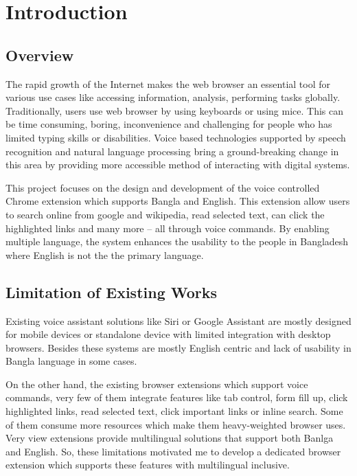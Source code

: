 


	\chapter{Introduction}
	\section{Overview}
	The rapid growth of the Internet makes the web browser an essential tool for various use cases like accessing information, analysis, performing tasks globally. Traditionally, users use web browser by using keyboards or using mice. This can be time consuming, boring, inconvenience and challenging for people who has limited typing skills or disabilities. Voice based technologies supported by speech recognition and natural language processing bring a ground-breaking change in this area by providing more accessible method of interacting with digital systems.
	
	
	This project focuses on the design and development of the voice controlled Chrome extension which supports Bangla and English. This extension allow users to search online from google and wikipedia, read selected text, can click the highlighted links and many more – all through voice commands. By enabling multiple language, the system enhances the usability to the people in Bangladesh where English is not the the primary language.
	
	
	\section{Limitation of Existing Works}
	Existing voice assistant solutions like Siri or Google Assistant are mostly designed for mobile devices or standalone device with limited integration with desktop browsers. Besides these systems are mostly English centric and lack of usability in Bangla language in some cases. 
	
	
	On the other hand, the existing browser extensions which support voice commands, very few of them integrate features like tab control, form fill up, click highlighted links, read selected text, click important links or inline search. Some of them consume more resources which make them  heavy-weighted browser uses. Very view extensions provide multilingual solutions that support both Banlga and English. So, these limitations motivated me to develop a dedicated browser extension which supports these features with multilingual inclusive.
	
